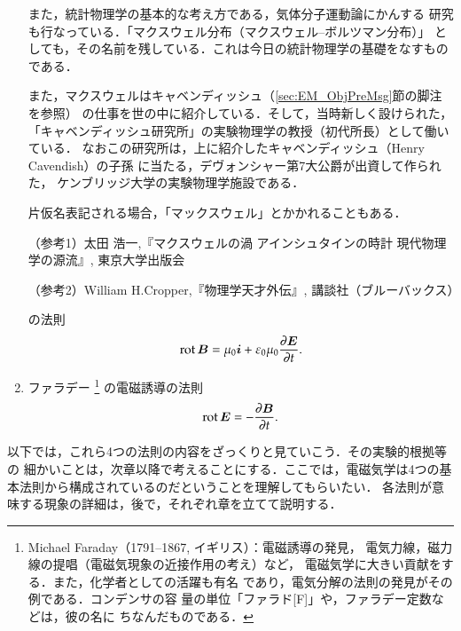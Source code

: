 \begin{enumerate}
{                        また，統計物理学の基本的な考え方である，気体分子運動論にかんする
                        研究も行なっている．「マクスウェル分布（マクスウェル--ボルツマン分布）」
                        としても，その名前を残している．これは今日の統計物理学の基礎をなすもの
                        である．

                        また，マクスウェルはキャベンディッシュ（\ref{sec:EM_ObjPreMsg}節の脚注を参照）
                        の仕事を世の中に紹介している．そして，当時新しく設けられた，
                        「キャベンディッシュ研究所」の実験物理学の教授（初代所長）として働いている．
                        なおこの研究所は，上に紹介したキャベンディッシュ（Henry Cavendish）の子孫
                        に当たる，デヴォンシャー第7大公爵が出資して作られた，
                        ケンブリッジ大学の実験物理学施設である．

                        片仮名表記される場合，「マックスウェル」とかかれることもある．

                        （参考1）太田 浩一,『マクスウェルの渦 アインシュタインの時計 現代物理学の源流』,
                        東京大学出版会

                        （参考2）William H.Cropper,『物理学天才外伝』, 講談社（ブルーバックス）
                    }
                    の法則
                    \begin{align}
                        \mathrm{rot}\, \boldsymbol{B} = \mu_{0}\boldsymbol{i} + \varepsilon_{0}\mu_{0}\frac{\partial \boldsymbol{E}}{\partial t}.
                    \end{align}
                \item ファラデー
                    \footnote{
                        Michael Faraday（1791--1867, イギリス）：電磁誘導の発見，
                        電気力線，磁力線の提唱（電磁気現象の近接作用の考え）など，
                        電磁気学に大きい貢献をする．また，化学者としての活躍も有名
                        であり，電気分解の法則の発見がその例である．コンデンサの容
                        量の単位「ファラド[F]」や，ファラデー定数などは，彼の名に
                        ちなんだものである．
                    }
                    の電磁誘導の法則
                    \begin{align}
                        \mathrm{rot}\, \boldsymbol{E} = - \frac{\partial \boldsymbol{B}}{\partial t}.
                    \end{align}
            \end{enumerate}

        以下では，これら4つの法則の内容をざっくりと見ていこう．その実験的根拠等の
        細かいことは，次章以降で考えることにする．ここでは，電磁気学は4つの基
        本法則から構成されているのだということを理解してもらいたい．
        各法則が意味する現象の詳細は，後で，それぞれ章を立てて説明する．

